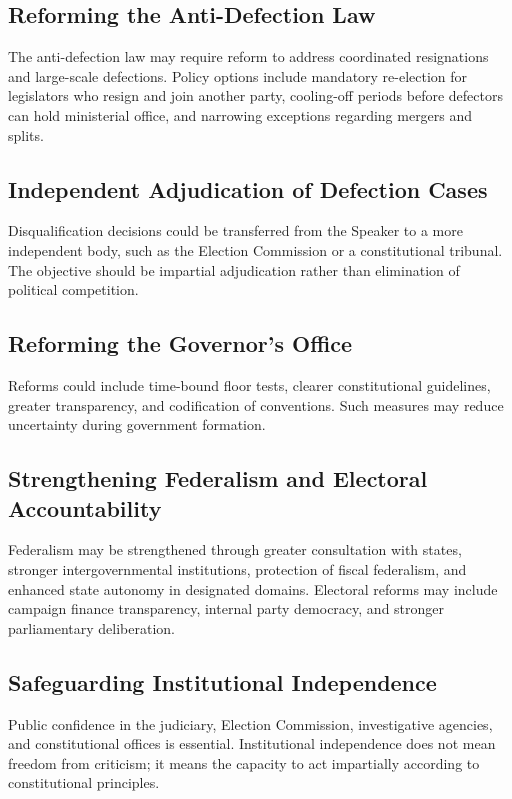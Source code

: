 \documentclass[11pt]{article}
\begin{document}
\subsection{Reforming the Anti-Defection Law}
The anti-defection law may require reform to address coordinated resignations and large-scale defections. Policy options include mandatory re-election for legislators who resign and join another party, cooling-off periods before defectors can hold ministerial office, and narrowing exceptions regarding mergers and splits.

\subsection{Independent Adjudication of Defection Cases}
Disqualification decisions could be transferred from the Speaker to a more independent body, such as the Election Commission or a constitutional tribunal. The objective should be impartial adjudication rather than elimination of political competition.

\subsection{Reforming the Governor's Office}
Reforms could include time-bound floor tests, clearer constitutional guidelines, greater transparency, and codification of conventions. Such measures may reduce uncertainty during government formation.

\subsection{Strengthening Federalism and Electoral Accountability}
Federalism may be strengthened through greater consultation with states, stronger intergovernmental institutions, protection of fiscal federalism, and enhanced state autonomy in designated domains. Electoral reforms may include campaign finance transparency, internal party democracy, and stronger parliamentary deliberation.

\subsection{Safeguarding Institutional Independence}
Public confidence in the judiciary, Election Commission, investigative agencies, and constitutional offices is essential. Institutional independence does not mean freedom from criticism; it means the capacity to act impartially according to constitutional principles.
\end{document}
